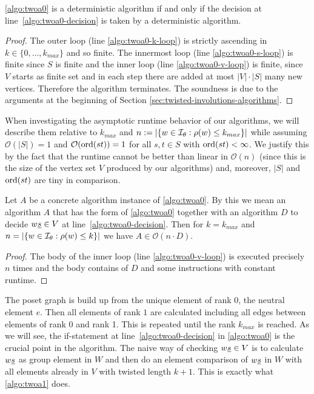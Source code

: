 \begin{lemm}
	\ref{algo:twoa0} is a deterministic algorithm if and only if the decision at line~\ref{algo:twoa0-decision} is taken by a deterministic algorithm.

	\begin{proof}
		The outer loop (line \ref{algo:twoa0-k-loop}) is strictly ascending in $k \in \{0,\ldots,k_{max}\}$ and so finite. The innermost loop (line \ref{algo:twoa0-s-loop}) is finite since $S$ is finite and the inner loop (line \ref{algo:twoa0-v-loop}) is finite, since $V$ starts as finite set and in each step there are added at most $|V| \cdot |S|$ many new vertices. Therefore the algorithm terminates. The soundness is due to the arguments at the beginning of Section \ref{sec:twisted-involutions-algorithms}.
	\end{proof}
\end{lemm}

When investigating the asymptotic runtime behavior of our algorithms, we will describe them relative to $k_{max}$ and $n := |\{ w \in \mathcal{I}_{\theta} : \rho(w) \leq k_{max} \}|$ while assuming $\mathcal{O}(|S|) = 1$ and $\mathcal{O}(\operatorname{ord}(st)) = 1$ for all $s,t \in S$ with $\operatorname{ord}(st) < \infty$. We justify this by the fact that the runtime cannot be better than linear in $\mathcal{O}(n)$ (since this is the size of the vertex set $V$ produced by our algorithms) and, moreover, $|S|$ and $\operatorname{ord}(st)$ are tiny in comparison.

\begin{prop}
	Let $A$ be a concrete algorithm instance of \ref{algo:twoa0}. By this we mean an algorithm $A$ that has the form of \ref{algo:twoa0} together with an algorithm $D$ to decide $w \underline{s} \in V$ at line~\ref{algo:twoa0-decision}. Then for $k = k_{max}$ and $n = |\{ w \in \mathcal{I}_{\theta} : \rho(w) \leq k \}|$ we have $A \in \mathcal{O}(n \cdot D)$.

	\begin{proof}
		The body of the inner loop (line \ref{algo:twoa0-v-loop}) is executed precisely $n$ times and the body contains of $D$ and some instructions with constant runtime.
	\end{proof}
\end{prop}

The poset graph is build up from the unique element of rank 0, the neutral element $e$. Then all elements of rank $1$ are calculated including all edges between elements of rank 0 and rank 1. This is repeated until the rank $k_{max}$ is reached. As we will see, the if-statement at line~\ref{algo:twoa0-decision} in \ref{algo:twoa0} is the crucial point in the algorithm. The naive way of checking $w \underline{s} \in V$ is to calculate $w \underline{s}$ as group element in $W$ and then do an element comparison of $w \underline{s}$ in $W$ with all elements already in $V$ with twisted length $k+1$. This is exactly what \ref{algo:twoa1} does.

